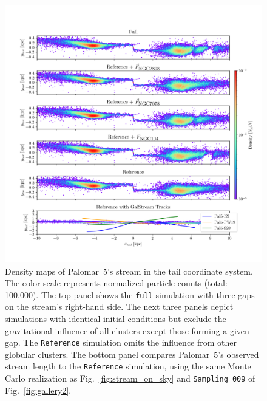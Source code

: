 \documentclass{aa}
\begin{document}
    \begin{figure}
      \centering
      \includegraphics[width=\linewidth]{decomposition-monte-carlo-009-with-3-gaps-domidpoint-shift.png}
      \caption{Density maps of Palomar~5's stream in the tail coordinate system. The color scale represents normalized particle counts (total: 100,000). The top panel shows the \texttt{full} simulation with three gaps on the stream's right-hand side. The next three panels depict simulations with identical initial conditions but exclude the gravitational influence of all clusters except those forming a given gap. The \texttt{Reference} simulation omits the influence from other globular clusters. The bottom panel compares Palomar~5's observed stream length to the \texttt{Reference} simulation, using the same Monte Carlo realization as Fig.~\ref{fig:stream_on_sky} and \texttt{Sampling~009} of Fig.~\ref{fig:gallery2}.}
      \label{fig:decomposition}
    \end{figure} 
    
\end{document}
